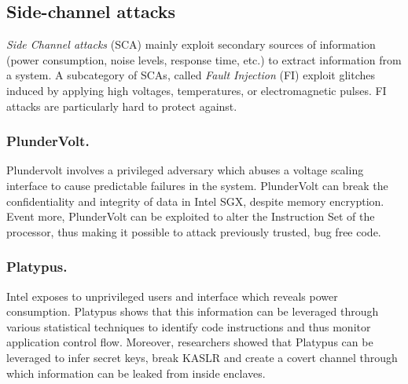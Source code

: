 \documentclass[runningheads,a4paper]{uwsese}
\begin{document}



\subsection{Side-channel attacks}
\label{sidechannel_attacks}

\emph{Side Channel attacks} (SCA) mainly exploit secondary sources of
information (power consumption, noise levels, response time, etc.) to extract
information from a system. A subcategory of SCAs, called \emph{Fault Injection}
(FI) exploit glitches induced by applying high voltages, temperatures, or
electromagnetic pulses. FI attacks are particularly hard to protect against.

\subsubsection{PlunderVolt.}

Plundervolt \cite{plundervolt} involves a privileged adversary which abuses a
voltage scaling interface to cause predictable failures in the system. PlunderVolt
can break the confidentiality and integrity of data in Intel SGX, despite memory
encryption. Event more, PlunderVolt can be exploited to alter the Instruction Set
of the processor, thus making it possible to attack previously trusted, bug free
code.

\subsubsection{Platypus.}

Intel exposes to unprivileged users and interface which reveals power
consumption. Platypus \cite{platypus} shows that this information can be
leveraged through various statistical techniques to identify code instructions
and thus monitor application control flow. Moreover, researchers showed that
Platypus can be leveraged to infer secret keys, break KASLR \cite{kaslr} and
create a covert channel through which information can be leaked from inside
enclaves.
\end{document}
